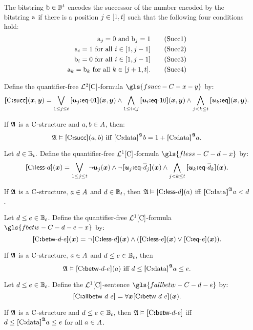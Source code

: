 The bitstring $\mathrm{b} \in \mathbb{B}^{t}$ encodes the successor of the number
encoded by the bitstring $\mathrm{a}$ if there is a position $j \in [1,t]$
such that the following four conditions hold:
\begin{align}
  \bstra_\jj = 0 \text{ and } \bstrb_\jj = 1 \tag{Succ1}\label{Succ1} \\
  \bstra_\ii = 1 \text{ for all } i \in [1,\jj-1] \tag{Succ2}\label{Succ2} \\
  \bstrb_\ii = 0 \text{ for all } i \in [1,\jj-1] \tag{Succ3}\label{Succ3} \\
  \bstra_\kk = \bstrb_\kk \text{ for all } \kk \in [\jj+1,\tbit].
  \tag{Succ4}\label{Succ4}
\end{align}
\begin{definition}
Define the quantifier-free $\mathcal{L}^{2}[{\mathrm{C}}]$-formula $\gls{fsucc-C-x-y}$ by:
\[
  {\bm{[}{\mathrm{C}}\mathord{\bm{:}}\mathsf{succ}\bm{]}}(\bm{x},\bm{y}) = \bigvee_{1 \leq j \leq t}
  {\bm{[}\bm{u}_{j}\mathord{\bm{:}}\mathsf{eq}{\hbox{-}}01\bm{]}}(\bm{x},\bm{y}) \land 
  \bigwedge_{1 \leq i < j} 
  {\bm{[}\bm{u}_{i}\mathord{\bm{:}}\mathsf{eq}{\hbox{-}}10\bm{]}}(\bm{x},\bm{y}) \land
  \bigwedge_{j < k \leq t} {\bm{[}\bm{u}_{k}\mathord{\bm{:}}\mathsf{eq}\bm{]}}(\bm{x},\bm{y}).
\]
\end{definition}
If $\mathfrak{A}$ is a ${\mathrm{C}}$-structure and $a, b \in A$,
then:
\[
  \miff{
  \StrA \vDash \fsucc\CS(\ea, \eb)}{
  \data\CS\StrA\eb = 1 + \data\CS\StrA\ea}.
\]

\begin{definition}
Let $d \in \mathbb{B}_{t}$.
Define the quantifier-free $\mathcal{L}^{1}[{\mathrm{C}}]$-formula $\gls{fless-C-d-x}$ by:
\[
  {\bm{[}{\mathrm{C}}\mathord{\bm{:}}\mathsf{less}{\hbox{-}}d\bm{]}}(\bm{x}) = \bigvee_{1 \leq j \leq t} \lnot\bm{u}_{j}(\bm{x})
  \land \lnot{\bm{[}\bm{u}_{j}\mathord{\bm{:}}\mathsf{eq}{\hbox{-}}\overline{d}_j\bm{]}}(\bm{x})
    \land \bigwedge_{j < k \leq t} {\bm{[}\bm{u}_{k}\mathord{\bm{:}}\mathsf{eq}{\hbox{-}}\overline{d}_k\bm{]}}(\bm{x}).
\]
\end{definition}
If $\mathfrak{A}$ is a ${\mathrm{C}}$-structure, $a \in A$ and $d \in
\mathbb{B}_{t}$, then $\mathfrak{A} \vDash {\bm{[}{\mathrm{C}}\mathord{\bm{:}}\mathsf{less}{\hbox{-}}d\bm{]}}(a)$ iff ${\bm{[}{\mathrm{C}}\mathord{\bm{:}}\mathrm{data}\bm{]}}^{\mathfrak{A}}a
< d$.

\begin{definition}
Let $d \leq e \in \mathbb{B}_{t}$.
Define the quantifier-free $\mathcal{L}^{1}[{\mathrm{C}}]$-formula $\gls{fbetw-C-d-e-x}$ by:
\[
  {\bm{[}{\mathrm{C}}\mathord{\bm{:}}\mathsf{betw}{\hbox{-}}d{\hbox{-}}e\bm{]}}(\bm{x}) = \lnot{\bm{[}{\mathrm{C}}\mathord{\bm{:}}\mathsf{less}{\hbox{-}}d\bm{]}}(\bm{x}) \land 
  ({\bm{[}{\mathrm{C}}\mathord{\bm{:}}\mathsf{less}{\hbox{-}}e\bm{]}}(\bm{x})\lor {\bm{[}{\mathrm{C}}\mathord{\bm{:}}\mathsf{eq}{\hbox{-}}e\bm{]}}(\bm{x})).
\]
\end{definition}
If $\mathfrak{A}$ is a ${\mathrm{C}}$-structure, $a \in A$ and $d \leq e \in
\mathbb{B}_{t}$, then 
\[
  \miff{
  \StrA \vDash \fbetw\CS\datad\datae(\ea)}{
  \datad \leq \data\CS\StrA\ea \leq
  \datae}.
\]

\begin{definition}
Let $d \leq e \in \mathbb{B}_{t}$.
Define the $\mathcal{L}^{1}[{\mathrm{C}}]$-sentence $\gls{fallbetw-C-d-e}$ by:
\[
  {\bm{[}{\mathrm{C}}\mathord{\bm{:}}\mathsf{allbetw}{\hbox{-}}d{\hbox{-}}e\bm{]}} = \forall\bm{x}{\bm{[}{\mathrm{C}}\mathord{\bm{:}}\mathsf{betw}{\hbox{-}}d{\hbox{-}}e\bm{]}}(\bm{x}).
\]
\end{definition}
If $\mathfrak{A}$ is a ${\mathrm{C}}$-structure and $d \leq e \in \mathbb{B}_{t}$,
then $\mathfrak{A} \vDash {\bm{[}{\mathrm{C}}\mathord{\bm{:}}\mathsf{betw}{\hbox{-}}d{\hbox{-}}e\bm{]}}$ iff
$d \leq {\bm{[}{\mathrm{C}}\mathord{\bm{:}}\mathrm{data}\bm{]}}^{\mathfrak{A}}a \leq e$ for all $a \in A$.
